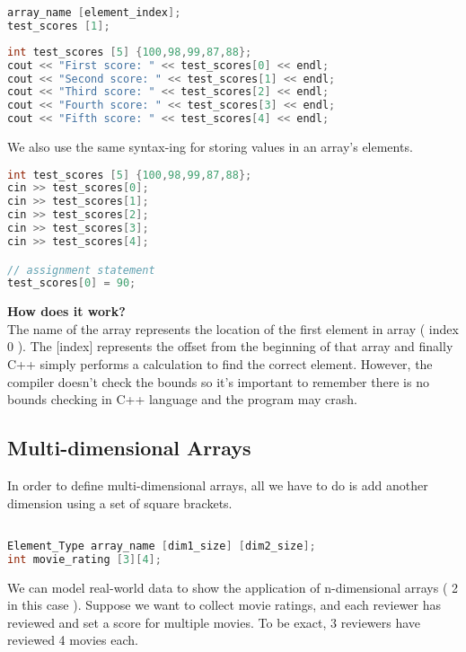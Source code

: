 \begin{mdframed}
\begin{lstlisting}[language=c]
array_name [element_index];
test_scores [1];
\end{lstlisting}
\end{mdframed}
\begin{mdframed}
\begin{lstlisting}[language=c]
int test_scores [5] {100,98,99,87,88};
cout << "First score: " << test_scores[0] << endl;
cout << "Second score: " << test_scores[1] << endl;
cout << "Third score: " << test_scores[2] << endl;
cout << "Fourth score: " << test_scores[3] << endl;
cout << "Fifth score: " << test_scores[4] << endl;
\end{lstlisting}
\end{mdframed}
We also use the same syntax-ing for storing values in an array's elements.
\begin{mdframed}
\begin{lstlisting}[language=c]
int test_scores [5] {100,98,99,87,88};
cin >> test_scores[0]; 
cin >> test_scores[1]; 
cin >> test_scores[2];
cin >> test_scores[3];
cin >> test_scores[4];

// assignment statement
test_scores[0] = 90;
\end{lstlisting}
\end{mdframed}
\textbf{How does it work?}\\
The name of the array represents the location of the first element in array ( index 0 ). The [index] represents the offset from the beginning of that array and finally C++ simply performs a calculation to find the correct element. However, the compiler doesn't check the bounds so it's important to remember there is no bounds checking in C++ language and the program may crash. 
\subsection{Multi-dimensional Arrays}
In order to define multi-dimensional arrays, all we have to do is add another dimension using a set of square brackets. 
\begin{mdframed}
\begin{lstlisting}[language=c]

Element_Type array_name [dim1_size] [dim2_size];
int movie_rating [3][4];

\end{lstlisting}
\end{mdframed}
We can model real-world data to show the application of n-dimensional arrays ( 2 in this case ). Suppose we want to collect movie ratings, and each reviewer has reviewed and set a score for multiple movies. To be exact, 3 reviewers have reviewed 4 movies each. 

